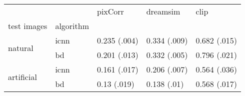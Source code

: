 \begin{tabular}{lllll}
\toprule
 &   & pixCorr & dreamsim & clip \\
test images & algorithm &  &  &  \\
\midrule
\multirow[t]{2}{*}{natural} & icnn & 0.235 (.004) & 0.334 (.009) & 0.682 (.015) \\
 & bd & 0.201 (.013) & 0.332 (.005) & 0.796 (.021) \\
\cline{1-5}
\multirow[t]{2}{*}{artificial} & icnn & 0.161 (.017) & 0.206 (.007) & 0.564 (.036) \\
 & bd & 0.13 (.019) & 0.138 (.01) & 0.568 (.017) \\
\cline{1-5}
\bottomrule
\end{tabular}
